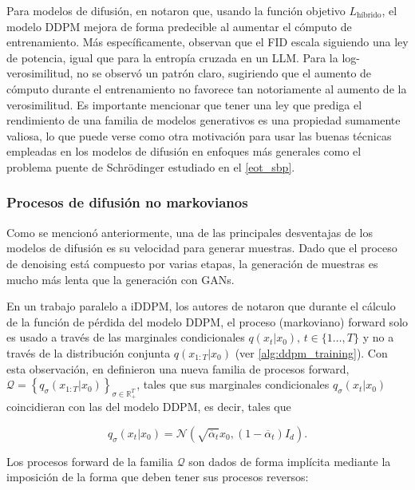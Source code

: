 Para modelos de difusión, en \cite{nichol2021improved} notaron que, usando la función objetivo $L_{\text{híbrido}}$, el modelo DDPM mejora de forma predecible al aumentar el cómputo de entrenamiento. Más específicamente, observan que el FID escala siguiendo una ley de potencia, igual que para la entropía cruzada en un LLM. Para la log-verosimilitud, no se observó un patrón claro, sugiriendo que el aumento de cómputo durante el entrenamiento no favorece tan notoriamente al aumento de la verosimilitud. Es importante mencionar que tener una ley que prediga el rendimiento de una familia de modelos generativos es una propiedad sumamente valiosa, lo que puede verse como otra motivación para usar las buenas técnicas empleadas en los modelos de difusión en enfoques más generales como el problema puente de Schrödinger estudiado en el \autoref{eot_sbp}.

\subsubsection{Procesos de difusión no markovianos}

Como se mencionó anteriormente, una de las principales desventajas de los modelos de difusión es su velocidad para generar muestras. Dado que el proceso de denoising está compuesto por varias etapas, la generación de muestras es mucho más lenta que la generación con GANs.

En un trabajo paralelo a iDDPM, los autores de \cite{song2022denoising} notaron que durante el cálculo de la función de pérdida del modelo DDPM, el proceso (markoviano) forward solo es usado a través de las marginales condicionales $q(x_t|x_0),\,t\in\{1\ldots,T\}$ y no a través de la distribución conjunta $q(x_{1:T}|x_0)$ (ver \autoref{alg:ddpm_training}). Con esta observación, en \cite{song2022denoising} definieron una nueva familia de procesos forward, $\mathcal{Q} = \left\{q_\sigma(x_{1:T}|x_0)\right\}_{\sigma\in\mathbb{R}_+^T}$, tales que sus marginales condicionales $q_\sigma(x_t|x_0)$ coincidieran con las del modelo DDPM, es decir, tales que

\begin{equation*}
    q_\sigma(x_t|x_0) = \mathcal{N}\left(\sqrt{\overline{\alpha}_t}x_0,(1-\overline{\alpha}_t)I_d\right).
\end{equation*}

Los procesos forward de la familia $\mathcal{Q}$ son dados de forma implícita mediante la imposición de la forma que deben tener sus procesos reversos:

